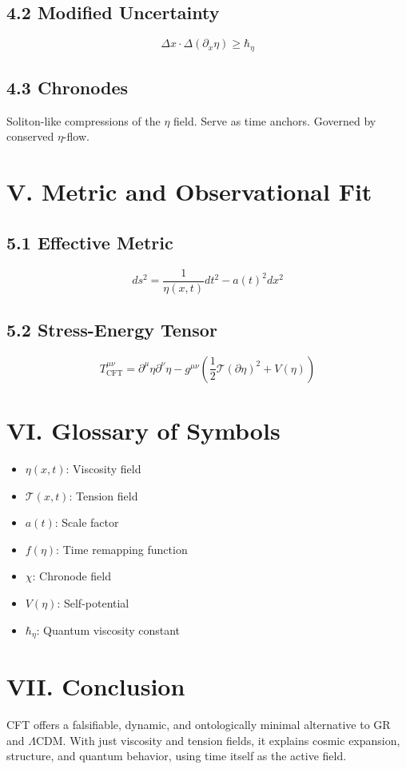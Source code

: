 \documentclass[12pt]{article}
\begin{document}
\subsection*{4.2 Modified Uncertainty}
\[
\Delta x \cdot \Delta(\partial_x \eta) \geq \hbar_\eta
\]

\subsection*{4.3 Chronodes}
Soliton-like compressions of the $\eta$ field. Serve as time anchors. Governed by conserved $\eta$-flow.

\section*{V. Metric and Observational Fit}

\subsection*{5.1 Effective Metric}
\[
ds^2 = \frac{1}{\eta(x,t)} dt^2 - a(t)^2 dx^2
\]

\subsection*{5.2 Stress-Energy Tensor}
\[
T^{\mu\nu}_{\text{CFT}} = \partial^\mu \eta \partial^\nu \eta - g^{\mu\nu} \left( \frac{1}{2} \mathcal{T} (\partial \eta)^2 + V(\eta) \right)
\]

\section*{VI. Glossary of Symbols}
\begin{itemize}
  \item $\eta(x,t)$: Viscosity field
  \item $\mathcal{T}(x,t)$: Tension field
  \item $a(t)$: Scale factor
  \item $f(\eta)$: Time remapping function
  \item $\chi$: Chronode field
  \item $V(\eta)$: Self-potential
  \item $\hbar_\eta$: Quantum viscosity constant
\end{itemize}

\section*{VII. Conclusion}
CFT offers a falsifiable, dynamic, and ontologically minimal alternative to GR and $\Lambda$CDM. With just viscosity and tension fields, it explains cosmic expansion, structure, and quantum behavior, using time itself as the active field.
\end{document}
